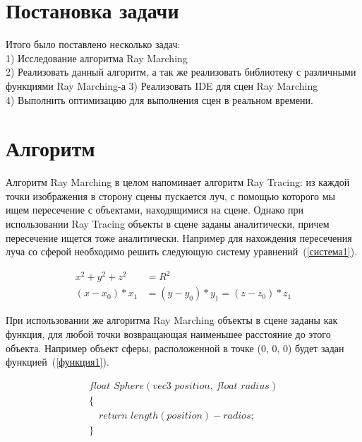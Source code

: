 \documentclass[14pt]{matmex-diploma}
\begin{document}
\section{Постановка задачи}
Итого было поставлено несколько задач: \\
1) Исследование алгоритма Ray Marching \\
2) Реализовать данный алгоритм, а так же реализовать библиотеку с различными функциями Ray Marching-а
3) Реализовать IDE для сцен Ray Marching \\
4) Выполнить оптимизацию для выполнения сцен в реальном времени. \\

\section{Алгоритм}
Алгоритм Ray Marching в целом напоминает алгоритм Ray Tracing: из каждой точки изображения в сторону сцены пускается луч,
с помощью которого мы ищем пересечение с объектами, находящимися на сцене. Однако при использовании
Ray Tracing объекты в сцене заданы аналитически, причем пересечение ищется тоже аналитически. Например для
нахождения пересечения луча со сферой необходимо решить следующую систему уравнений~(\ref{система1}). 

\begin{equation}
\label{система1}
\begin{array}{rl}
x^2 + y^2 + z^2 & = R^2\\
(x - x_{0}) * x_{1} & = (y - y_{0}) * y_{1} = (z - z_{0}) * z_{1}
\end{array}
\end{equation}

При использовании же алгоритма Ray Marching объекты в сцене заданы как функция, для любой точки возвращающая 
наименьшее расстояние до этого объекта. Например объект
сферы, расположенной в точке (0, 0, 0) будет задан функцией~(\ref{функция1}). 

\begin{equation}
\label{функция1}
\begin{array}{ll}
float\,\,Sphere(vec3\,\,position,\, float\,\,radius)\\
\{                                                  \\
\,\,\,\,\,\, return\,\,length(position) - radios;   \\
\}                                                  \\
\end{array}
\end{equation}
\end{document}
